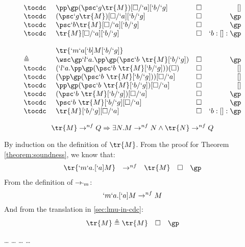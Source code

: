 \begin{Proof}
\[\begin{array}{llrr}
  \tocdc\    & \pp \gp (\psc `g \tr{M})[\square/`a][`b/`g]          & \square & []  \\
  \tocdc\    & (\psc `g \tr{M})[\square/`a][`b/`g]                  & \square & \gp  \\
  \tocdc\    & \psc `b \tr{M}[\square/`a][`b/`g]                    & \square & \gp  \\
  \tocdc\    & \tr{M}[\square/`a][`b/`g]                            & \square & `b:[]:\gp  \\
  \\
             & \tr{`m`a[`b]M[`b/`g]} \\
  \triangleq & \wsc \gp `l`a.\pp \gp (\psc `b\ \tr{M}[`b/`g])   & \square & \gp       \\
  \tocdc\     & (`l`a.\pp \gp (\psc `b\ \tr{M}[`b/`g]))(\square) & \square & []        \\
  \tocdc\     & (\pp \gp (\psc `b\ \tr{M}[`b/`g]))[\square/`a]   & \square & []        \\
  \tocdc\     & \pp \gp (\psc `b\ \tr{M}[`b/`g])[\square/`a]     & \square & []        \\
  \tocdc\     & (\psc `b\ \tr{M}[`b/`g])[\square/`a]             & \square & \gp       \\
  \tocdc\     & \psc `b\ \tr{M}[`b/`g][\square/`a]               & \square & \gp       \\
  \tocdc\     & \tr{M}[`b/`g][\square/`a]                        & \square & `b:[]:\gp \\
\end{array}
\]
\end{Proof}

\begin{theorem}[Completeness of $\tr{`.}$]
\[
  \tr{M} \to^{nf} Q \Rightarrow \exists N. M \to^{nf} N \land \tr{N} \to^{nf} Q
\]
\end{theorem}
\begin{Proof}
By induction on the definition of $\tr{M}$.
From the proof for Theorem \ref{theorem:soundness}, we know that:
\[
\begin{array}{rclll}
\tr{`m`a.[`a]M} & \to^{nf} & \tr{M} & \square & \gp
\end{array}
\]
From the definition of $\to_{`m}$:
\[
`m`a.[`a]M \to^{nf} M
\]
And from the translation in \ref{sec:lmu-in-cdc}:
\[
\begin{array}{rclll}
\tr{M} \triangleq \tr{M} & \square & \gp 
\end{array}
\]

\dots
{}
\dots
{}
\dots
{}
\dots
\end{Proof}


